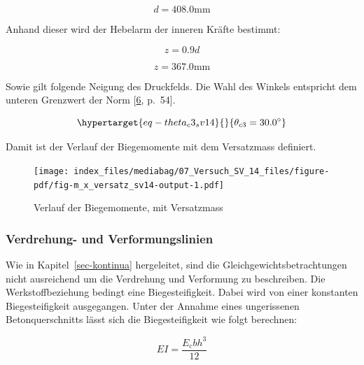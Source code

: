 \documentclass[
  12pt,
  letterpaper,
  egregdoesnotlikesansseriftitles]{scrreprt}
\begin{document}
\begin{equation}d = 408.0 \text{mm}\end{equation}

Anhand dieser wird der Hebelarm der inneren Kräfte bestimmt:

\begin{equation}z = 0.9 d\end{equation}

\begin{equation}z = 367.0 \text{mm}\end{equation}

Sowie gilt folgende Neigung des Druckfelds. Die Wahl des Winkels
entspricht dem unteren Grenzwert der Norm
{[}\protect\hyperlink{ref-SIA2013a}{6}, p.~54{]}.

\begin{equation}\protect\hypertarget{eq-theta_c3_sv14}{}{
 \theta_{c3} = 30.0^{\circ}
}\label{eq-theta_c3_sv14}\end{equation}

Damit ist der Verlauf der Biegemomente mit dem Versatzmass definiert.

\begin{figure}[H]

{\centering \texttt{[image: index\_files/mediabag/07\_Versuch\_SV\_14\_files/figure-pdf/fig-m\_x\_versatz\_sv14-output-1.pdf]}

}

\caption{\label{fig-m_x_versatz_sv14}Verlauf der Biegemomente, mit
Versatzmass}

\end{figure}

\hypertarget{verdrehung--und-verformungslinien-1}{%
\subsubsection{Verdrehung- und
Verformungslinien}\label{verdrehung--und-verformungslinien-1}}

Wie in Kapitel~\ref{sec-kontinua} hergeleitet, sind die
Gleichgewichtsbetrachtungen nicht ausreichend um die Verdrehung und
Verformung zu beschreiben. Die Werkstoffbeziehung bedingt eine
Biegesteifigkeit. Dabei wird von einer konstanten Biegesteifigkeit
ausgegangen. Unter der Annahme eines ungerissenen Betonquerschnitts
lässt sich die Biegesteifigkeit wie folgt berechnen:

\begin{equation}EI = \frac{E_{c} b h^{3}}{12}\end{equation}
\end{document}
